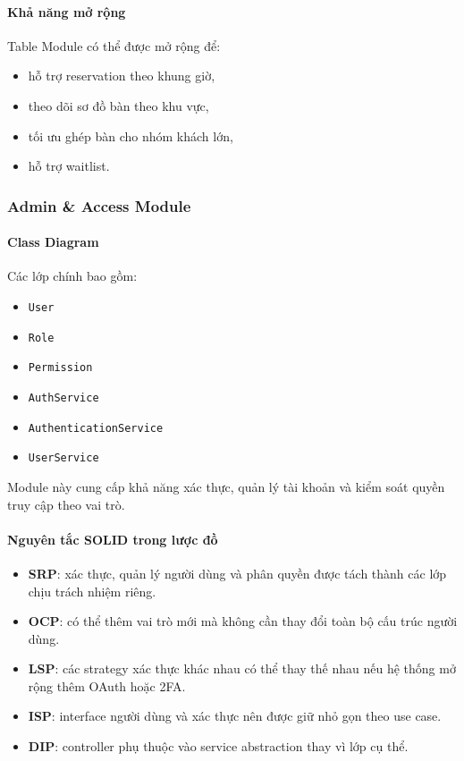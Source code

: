 \documentclass[12pt,a4paper]{article}
\begin{document}
\paragraph{Khả năng mở rộng}
Table Module có thể được mở rộng để:
\begin{itemize}
    \item hỗ trợ reservation theo khung giờ,
    \item theo dõi sơ đồ bàn theo khu vực,
    \item tối ưu ghép bàn cho nhóm khách lớn,
    \item hỗ trợ waitlist.
\end{itemize}

\subsubsection{Admin \& Access Module}

\paragraph{Class Diagram}
Các lớp chính bao gồm:
\begin{itemize}
    \item \texttt{User}
    \item \texttt{Role}
    \item \texttt{Permission}
    \item \texttt{AuthService}
    \item \texttt{AuthenticationService}
    \item \texttt{UserService}
\end{itemize}

Module này cung cấp khả năng xác thực, quản lý tài khoản và kiểm soát quyền truy cập theo vai trò.

\paragraph{Nguyên tắc SOLID trong lược đồ}
\begin{itemize}
    \item \textbf{SRP}: xác thực, quản lý người dùng và phân quyền được tách thành các lớp chịu trách nhiệm riêng.
    \item \textbf{OCP}: có thể thêm vai trò mới mà không cần thay đổi toàn bộ cấu trúc người dùng.
    \item \textbf{LSP}: các strategy xác thực khác nhau có thể thay thế nhau nếu hệ thống mở rộng thêm OAuth hoặc 2FA.
    \item \textbf{ISP}: interface người dùng và xác thực nên được giữ nhỏ gọn theo use case.
    \item \textbf{DIP}: controller phụ thuộc vào service abstraction thay vì lớp cụ thể.
\end{itemize}
\end{document}
